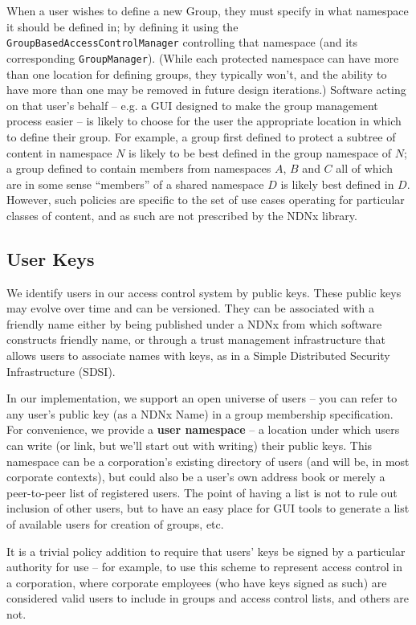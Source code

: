 When a user wishes to define a new Group, they must specify in what
namespace it should be defined in; by defining it using the {\tt
  GroupBasedAccessControlManager} controlling that namespace (and its
corresponding {\tt GroupManager}). (While each protected namespace can
have more than one location for defining groups, they typically won't,
and the ability to have more than one may be removed in future design
iterations.) Software acting on that user's behalf -- e.g. a GUI
designed to make the group management process easier -- is likely to
choose for the user the appropriate location in which to define their
group. For example, a group first defined to protect a subtree of
content in namespace $N$ is likely to be best defined in the group
namespace of $N$; a group defined to contain members from namespaces
$A$, $B$ and $C$ all of which are in some sense ``members'' of a
shared namespace $D$ is likely best defined in $D$. However, such
policies are specific to the set of use cases operating for particular
classes of content, and as such are not prescribed by the NDNx
library.

\subsection{User Keys}

We identify users in our access control system by public keys. These
public keys may evolve over time and can be versioned. They can be
associated with a friendly name either by being published under a NDNx
from which software constructs friendly name, or through a trust
management infrastructure that allows users to associate names with
keys, as in a Simple Distributed Security Infrastructure (SDSI).

In our implementation, we support an open universe of users -- you can
refer to any user's public key (as a NDNx Name) in a group membership
specification. For convenience, we provide a {\bf user namespace} -- a
location under which users can write (or link, but we'll start out
with writing) their public keys. This namespace can be a corporation's
existing directory of users (and will be, in most corporate contexts),
but could also be a user's own address book or merely a peer-to-peer
list of registered users. The point of having a list is not to rule
out inclusion of other users, but to have an easy place for GUI tools
to generate a list of available users for creation of groups, etc.

It is a trivial policy addition to require that users' keys be signed
by a particular authority for use -- for example, to use this scheme
to represent access control in a corporation, where corporate
employees (who have keys signed as such) are considered valid users to
include in groups and access control lists, and others are not.

